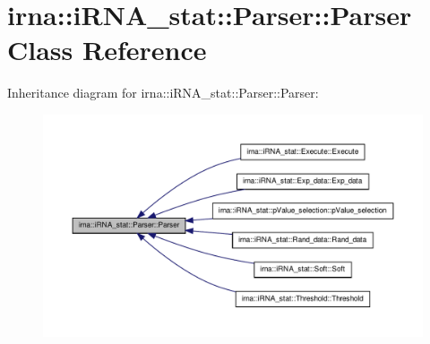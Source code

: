 \hypertarget{classirna_1_1iRNA__stat_1_1Parser_1_1Parser}{
\section{irna\-:\-:i\-R\-N\-A\-\_\-stat\-:\-:\-Parser\-:\-:\-Parser \-Class \-Reference}
\label{classirna_1_1iRNA__stat_1_1Parser_1_1Parser}
}


\-Inheritance diagram for irna\-:\-:i\-R\-N\-A\-\_\-stat\-:\-:\-Parser\-:\-:\-Parser\-:\nopagebreak
\begin{figure}[H]
\begin{center}
\leavevmode
\includegraphics[width=350pt]{classirna_1_1iRNA__stat_1_1Parser_1_1Parser__inherit__graph}
\end{center}
\end{figure}

